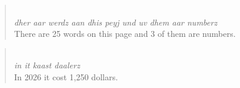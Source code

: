 \begin{quote}\noindent {}\\[1pt]
\textit{dher aar werdz aan dhis peyj und uv dhem aar numberz}\\[1pt]
There are 25 words on this page and 3 of them are numbers.
\end{quote}
\begin{quote}\noindent {}\\[1pt]
\textit{in it kaast daalerz}\\[1pt]
In 2026 it cost 1,250 dollars.
\end{quote}